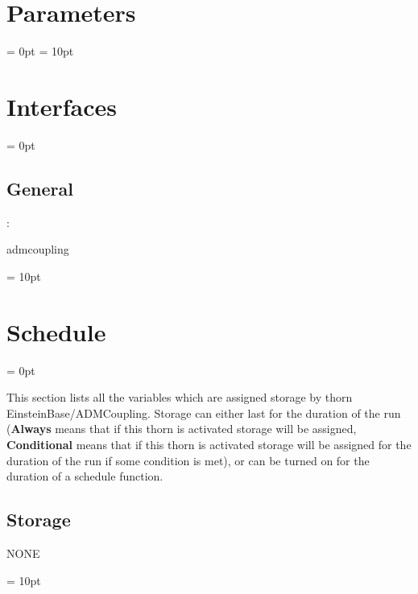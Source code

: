 \documentclass{article}
\begin{document}



\section{Parameters} 


\parskip = 0pt
\parskip = 10pt 

\section{Interfaces} 


\parskip = 0pt

\vspace{3mm} \subsection*{General}

: 

admcoupling
\vspace{2mm}

\vspace{5mm}\parskip = 10pt 

\section{Schedule} 


\parskip = 0pt


\noindent This section lists all the variables which are assigned storage by thorn EinsteinBase/ADMCoupling.  Storage can either last for the duration of the run ({\bf Always} means that if this thorn is activated storage will be assigned, {\bf Conditional} means that if this thorn is activated storage will be assigned for the duration of the run if some condition is met), or can be turned on for the duration of a schedule function.


\subsection*{Storage}NONE

\vspace{5mm}\parskip = 10pt 
\end{document}
